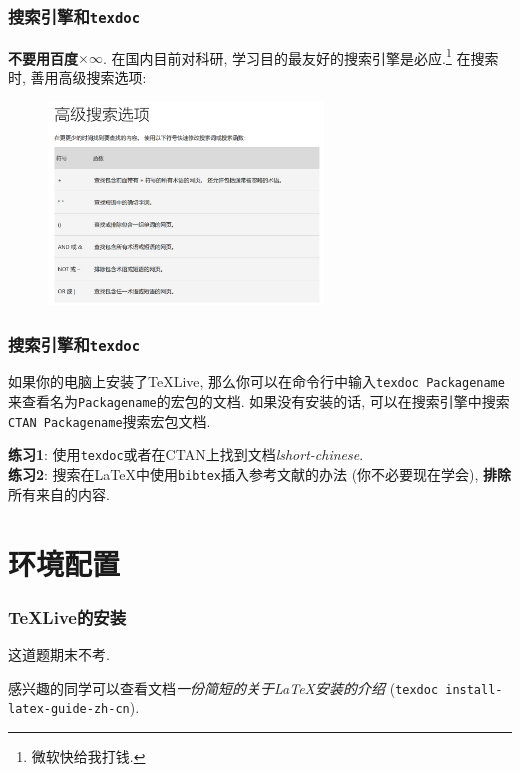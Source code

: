 \documentclass{beamer}
\begin{document}
\begin{frame}
    \frametitle{搜索引擎和\Verb|texdoc|}
    \textbf{不要用百度}$\times\infty$.
    在国内目前对科研, 学习目的最友好的搜索引擎是必应.\footnote{微软快给我打钱.}
    在搜索时, 善用高级搜索选项:
    \begin{figure}[h]
        \centering
        \includegraphics[width=0.65\textwidth]{figure/bing-search.png}
    \end{figure}
\end{frame}

\begin{frame}[fragile]
    \frametitle{搜索引擎和\Verb|texdoc|}
    如果你的电脑上安装了\TeX{}Live, 那么你可以在命令行中输入\Verb|texdoc Packagename|来查看名为\Verb|Packagename|的宏包的文档.
    如果没有安装的话, 可以在搜索引擎中搜索\Verb|CTAN Packagename|搜索宏包文档.\pause

    \textbf{练习1}: 使用\Verb|texdoc|或者在CTAN上找到文档\emph{lshort-chinese}.\\
    \textbf{练习2}: 搜索在\LaTeX{}中使用\Verb|bibtex|插入参考文献的办法 (你不必要现在学会), \textbf{排除}所有来自的内容.
\end{frame}

\section{环境配置}

\begin{frame}
    \frametitle{\TeX{}Live的安装}
    这道题期末不考.\pause

    感兴趣的同学可以查看文档\emph{一份简短的关于\LaTeX{}安装的介绍} (\Verb|texdoc install-latex-guide-zh-cn|).
\end{frame}
\end{document}
